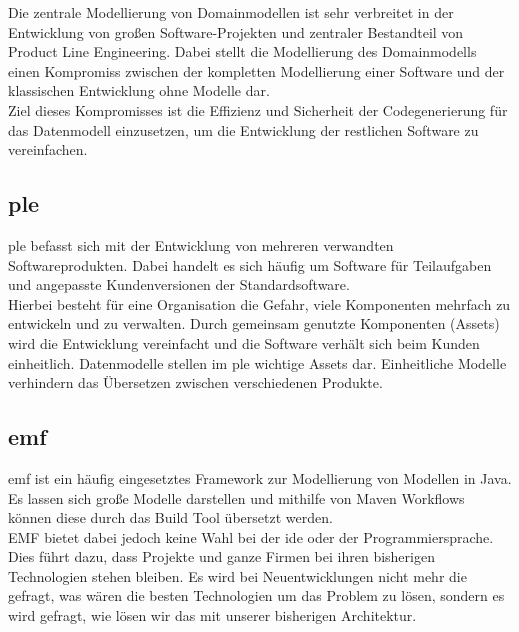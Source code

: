 \documentclass[./einleitung.tex]{subfiles}
\begin{document}
Die zentrale Modellierung von Domainmodellen ist sehr verbreitet in der Entwicklung von großen Software-Projekten und zentraler Bestandteil von Product Line Engineering.
Dabei stellt die Modellierung des Domainmodells einen Kompromiss zwischen der kompletten Modellierung einer Software und der klassischen Entwicklung ohne Modelle dar. \\
Ziel dieses Kompromisses ist die Effizienz und Sicherheit der Codegenerierung für das Datenmodell einzusetzen, um die Entwicklung der restlichen Software zu vereinfachen.
\subsection{\acrfull{ple}}\label{subsec:ple}
\acrshort{ple} befasst sich mit der Entwicklung von mehreren verwandten Softwareprodukten.
Dabei handelt es sich häufig um Software für Teilaufgaben und angepasste Kundenversionen der Standardsoftware. \\
Hierbei besteht für eine Organisation die Gefahr, viele Komponenten mehrfach zu entwickeln und zu verwalten.
Durch gemeinsam genutzte Komponenten (Assets) wird die Entwicklung vereinfacht und die Software verhält sich beim Kunden einheitlich.
Datenmodelle stellen im \acrshort{ple} wichtige Assets dar.
Einheitliche Modelle verhindern das Übersetzen zwischen verschiedenen Produkte.

\subsection{\acrshort{emf}}\label{subsec:emf}
\acrfull{emf} ist ein häufig eingesetztes Framework zur Modellierung von Modellen in Java.
Es lassen sich große Modelle darstellen und mithilfe von Maven Workflows können diese durch das Build Tool übersetzt werden. \\
EMF bietet dabei jedoch keine Wahl bei der \acrshort{ide} oder der Programmiersprache.
Dies führt dazu, dass Projekte und ganze Firmen bei ihren bisherigen Technologien stehen bleiben.
Es wird bei Neuentwicklungen nicht mehr die gefragt, was wären die besten Technologien um das Problem zu lösen, sondern es wird gefragt, wie lösen wir das mit unserer bisherigen Architektur.
\end{document}
